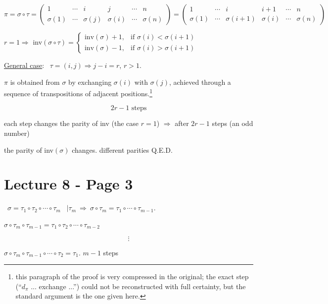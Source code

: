 \[
\pi=\sigma\circ\tau = \begin{pmatrix}1&\cdots&i&j&\cdots&n\\ \sigma(1)&\cdots&\sigma(j)&\sigma(i)&\cdots&\sigma(n)\end{pmatrix}
= \begin{pmatrix}1&\cdots&i&i+1&\cdots&n\\ \sigma(1)&\cdots&\sigma(i+1)&\sigma(i)&\cdots&\sigma(n)\end{pmatrix}
\]

\bigskip
\noindent $r=1 \Rightarrow$ inv$(\sigma\circ\tau) =
\begin{cases}
\text{inv}(\sigma)+1, & \text{if } \sigma(i)<\sigma(i+1)\\
\text{inv}(\sigma)-1, & \text{if } \sigma(i)>\sigma(i+1)
\end{cases}$

\bigskip
\noindent\underline{General case}: \ $\tau=(i,j) \Rightarrow j-i=r$, $r>1$.

\noindent $\pi$ is obtained from $\sigma$ by exchanging $\sigma(i)$ with $\sigma(j)$, achieved through a sequence of transpositions of adjacent positions.\footnote{this paragraph of the proof is very compressed in the original; the exact step (``$d_\pi$ ... exchange ...'') could not be reconstructed with full certainty, but the standard argument is the one given here.}

\[
2r-1 \text{ steps}
\]

\noindent each step changes the parity of inv (the case $r=1$) $\Rightarrow$ after $2r-1$ steps (an odd number)

\noindent the parity of inv$(\sigma)$ changes. \hfill different parities \quad Q.E.D.



\section*{Lecture 8 - Page 3}

\noindent{} \ $\sigma=\tau_1\circ\tau_2\circ\cdots\circ\tau_m$ \ $\big|\tau_m \ \Rightarrow \ \sigma\circ\tau_m = \tau_1\circ\cdots\circ\tau_{m-1}.$

\bigskip
\noindent $\sigma\circ\tau_m\circ\tau_{m-1} = \tau_1\circ\tau_2\circ\cdots\circ\tau_{m-2}$

\[
\vdots
\]

\noindent $\sigma\circ\tau_m\circ\tau_{m-1}\circ\cdots\circ\tau_2 = \tau_1$. \quad $m-1$ steps

